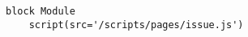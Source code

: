 
\lstset{language=lisp}

\begin{lstlisting}[frame=single]
block Module
	script(src='/scripts/pages/issue.js')
\end{lstlisting}
